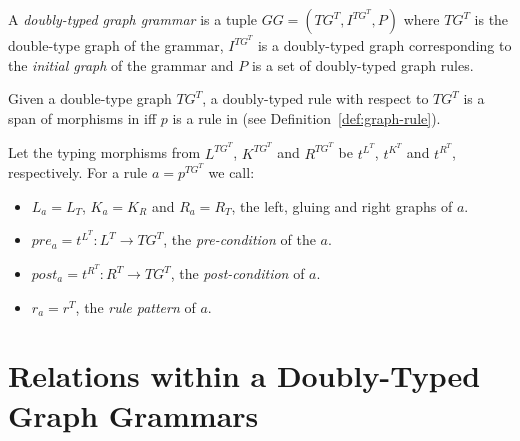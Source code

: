 \begin{definition} A \emph{doubly-typed graph grammar} is a tuple $GG = \left(TG^T, I^{TG^T},P \right)$ where $TG^T$ is the double-type graph of the grammar, $I^{TG^T}$ is a doubly-typed graph corresponding to the \emph{initial graph} of the grammar and $P$ is a set of doubly-typed graph rules. 
\end{definition}

\begin{definition} Given a double-type graph $TG^T$, a doubly-typed rule with respect to $TG^T$ is a span of morphisms \doublyTypedRule{} in \doublyTypedGraphCategory{} iff $p$ is a rule in \typedGraphCategory{} (see Definition~\ref{def:graph-rule}).

  Let the typing morphisms from $L^{TG^T}$, $K^{TG^T}$ and $R^{TG^T}$ be $t^{L^T}$, $t^{K^T}$ and $t^{R^T}$, respectively. For a rule $a = p^{TG^T}$ we call:

  \begin{itemize}
    \item $L_a = L_T$, $K_a = K_R$ and $R_a = R_T$, the left, gluing and right graphs of $a$.
    \item $pre_a = t^{L^T} : L^T \rightarrow TG^T$, the \emph{pre-condition} of the $a$.
    \item $post_a = t^{R^T} : R^T \rightarrow TG^T$, the \emph{post-condition} of $a$.
    \item $r_a = r^T$, the \emph{rule pattern} of $a$.
  \end{itemize}
\end{definition}

\section{Relations within a Doubly-Typed Graph Grammars}


